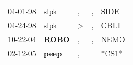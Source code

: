 \begin{supertabular}{p{0.07\textwidth}p{0.06\textwidth}p{0.02\textwidth}p{0.02\textwidth}p{0.06\textwidth}}
 04-01-98\textsuperscript{} &           slpk\textsuperscript{} &             , &  , &  SIDE\textsuperscript{} \\
 04-24-98\textsuperscript{} &           slpk\textsuperscript{} &  \textgreater &  , &  OBLI\textsuperscript{} \\
 10-22-04\textsuperscript{} &  \textbf{ROBO\textsuperscript{}} &             , &  , &  NEMO\textsuperscript{} \\
 02-12-05\textsuperscript{} &  \textbf{peep\textsuperscript{}} &             , &    &                   *CS1* \\
\end{supertabular}
